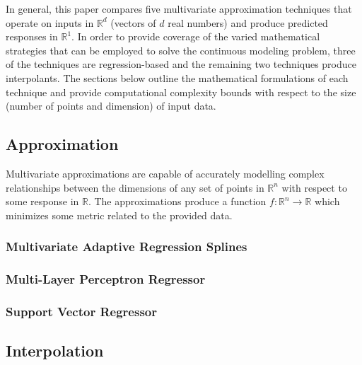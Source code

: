 \documentclass{scspaperproc}
\theoremstyle{scsthe}
\begin{document}


In general, this paper compares five multivariate approximation
techniques that operate on inputs in $\mathbb{R}^d$ (vectors of $d$
real numbers) and produce predicted responses in $\mathbb{R}^1$. In
order to provide coverage of the varied mathematical strategies that
can be employed to solve the continuous modeling problem, three of the
techniques are regression-based and the remaining two techniques
produce interpolants. The sections below outline the mathematical
formulations of each technique and provide computational complexity
bounds with respect to the size (number of points and dimension) of
input data.

\subsection{Approximation}
Multivariate approximations are capable of accurately modelling
complex relationships between the dimensions of any set of points in
$\mathbb{R}^n$ with respect to some response in $\mathbb{R}$. The
approximations produce a function $f: \mathbb{R}^n \rightarrow
\mathbb{R}$ which minimizes some metric related to the provided data.

\subsubsection{Multivariate Adaptive Regression Splines}
\subsubsection{Multi-Layer Perceptron Regressor}
\subsubsection{Support Vector Regressor}

\subsection{Interpolation}
\end{document}
